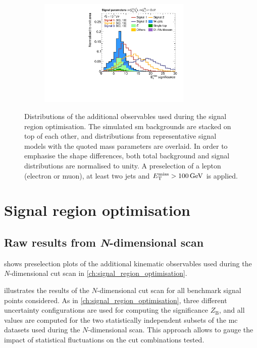 \begin{figure}
\begin{subfigure}[b]{0.5\linewidth}
	\end{subfigure}\hfill
	\par\medskip
	\begin{subfigure}[b]{0.5\linewidth}
		\centering\includegraphics[width=0.8\textwidth]{presel/metsig}
	\end{subfigure}
	\caption{Distributions of the additional observables used during the signal region optimisation. The simulated \gls{sm} backgrounds are stacked on top of each other, and distributions from representative signal models with the quoted mass parameters are overlaid. In order to emphasise the shape differences, both total background and signal distributions are normalised to unity. A preselection of a lepton (electron or muon), at least two jets and $\etmiss > \SI{100}{\GeV}$ is applied.}\label{fig:additional_presel_plots}
\end{figure}

\section{Signal region optimisation}\label{app:n-1_plots_cut_opt}

\graphicspath{{chapter-optimisation/Figs/Vector/}{chapter-optimisation/Figs/}}

\subsection{Raw results from \textit{N}-dimensional scan}

 shows preselection plots of the additional kinematic observables used during the \textit{N}-dimensional cut scan in \cref{ch:signal_region_optimisation}.

 illustrates the results of the $N$-dimensional cut scan for all benchmark signal points considered. As in \cref{ch:signal_region_optimisation}, three different uncertainty configurations are used for computing the significance $Z_\mathrm{B}$, and all values are computed for the two statistically independent subsets of the \gls{mc} datasets used during the $N$-dimensional scan. This approach allows to gauge the impact of statistical fluctuations on the cut combinations tested.

